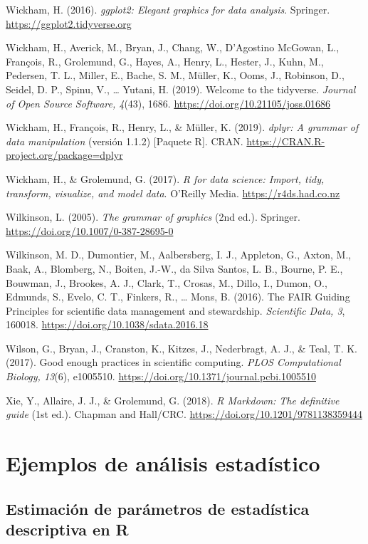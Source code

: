 \documentclass[
  spanish,
  a4paper,
  DIV=11,
  numbers=noendperiod,
  onepage,
  openany]{scrreprt}
\begin{document}
Wickham, H. (2016). \emph{ggplot2: Elegant graphics for data analysis}.
Springer. \url{https://ggplot2.tidyverse.org}

Wickham, H., Averick, M., Bryan, J., Chang, W., D'Agostino McGowan, L.,
François, R., Grolemund, G., Hayes, A., Henry, L., Hester, J., Kuhn, M.,
Pedersen, T. L., Miller, E., Bache, S. M., Müller, K., Ooms, J.,
Robinson, D., Seidel, D. P., Spinu, V., \ldots{} Yutani, H. (2019).
Welcome to the tidyverse. \emph{Journal of Open Source Software, 4}(43),
1686. \url{https://doi.org/10.21105/joss.01686}

Wickham, H., François, R., Henry, L., \& Müller, K. (2019). \emph{dplyr:
A grammar of data manipulation} (versión 1.1.2) {[}Paquete R{]}. CRAN.
\url{https://CRAN.R-project.org/package=dplyr}

Wickham, H., \& Grolemund, G. (2017). \emph{R for data science: Import,
tidy, transform, visualize, and model data}. O'Reilly Media.
\url{https://r4ds.had.co.nz}

Wilkinson, L. (2005). \emph{The grammar of graphics} (2nd ed.).
Springer. \url{https://doi.org/10.1007/0-387-28695-0}

Wilkinson, M. D., Dumontier, M., Aalbersberg, I. J., Appleton, G.,
Axton, M., Baak, A., Blomberg, N., Boiten, J.-W., da Silva Santos, L.
B., Bourne, P. E., Bouwman, J., Brookes, A. J., Clark, T., Crosas, M.,
Dillo, I., Dumon, O., Edmunds, S., Evelo, C. T., Finkers, R., \ldots{}
Mons, B. (2016). The FAIR Guiding Principles for scientific data
management and stewardship. \emph{Scientific Data, 3}, 160018.
\url{https://doi.org/10.1038/sdata.2016.18}

Wilson, G., Bryan, J., Cranston, K., Kitzes, J., Nederbragt, A. J., \&
Teal, T. K. (2017). Good enough practices in scientific computing.
\emph{PLOS Computational Biology, 13}(6), e1005510.
\url{https://doi.org/10.1371/journal.pcbi.1005510}

Xie, Y., Allaire, J. J., \& Grolemund, G. (2018). \emph{R Markdown: The
definitive guide} (1st ed.). Chapman and Hall/CRC.
\url{https://doi.org/10.1201/9781138359444}

\part{Ejemplos de análisis estadístico}


\chapter{Estimación de parámetros de estadística descriptiva en
R}\label{estimaciuxf3n-de-paruxe1metros-de-estaduxedstica-descriptiva-en-r}
\end{document}
